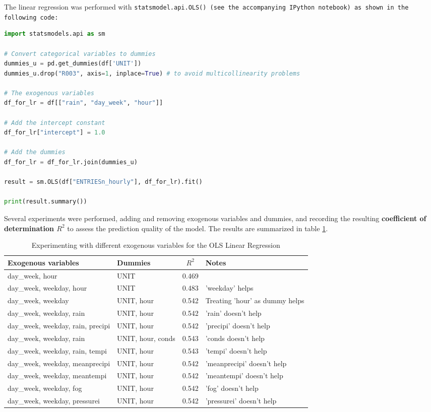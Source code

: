 \documentclass{article}
\begin{document}
The linear regression was performed with \tt statsmodel.api.OLS() \rm (see the accompanying IPython notebook) as shown in the following code:

\begin{lstlisting}[language=Python]
import statsmodels.api as sm

# Convert categorical variables to dummies
dummies_u = pd.get_dummies(df['UNIT'])
dummies_u.drop("R003", axis=1, inplace=True) # to avoid multicollinearity problems

# The exogenous variables
df_for_lr = df[["rain", "day_week", "hour"]]

# Add the intercept constant
df_for_lr["intercept"] = 1.0

# Add the dummies
df_for_lr = df_for_lr.join(dummies_u)

result = sm.OLS(df["ENTRIESn_hourly"], df_for_lr).fit()

print(result.summary())
\end{lstlisting}

Several experiments were performed, adding and removing exogenous variables and dummies, and recording the resulting \textbf{coefficient of determination $R^2$} to assess the prediction quality of the model. The results are summarized in table \ref{tab:lin_regr_exper}.


\begin{table}[ht]
\centering
\begin{tabular}{l|l|c|l}
\hline
Exogenous variables & Dummies & $R^2$ & Notes\\
\hline
day\_week, hour  & UNIT & 0.469 \\
day\_week, weekday, hour & UNIT & 0.483 & 'weekday' helps  \\
day\_week, weekday & UNIT, hour & 0.542 & Treating 'hour' as dummy helps \\
day\_week, weekday, rain & UNIT, hour & 0.542 & 'rain' doesn't help \\
day\_week, weekday, rain, precipi & UNIT, hour & 0.542 & 'precipi' doesn't help \\
day\_week, weekday, rain & UNIT, hour, conds & 0.543 & 'conds doesn't help \\
day\_week, weekday, rain, tempi & UNIT, hour & 0.543 & 'tempi' doesn't help \\
day\_week, weekday, meanprecipi & UNIT, hour & 0.542 & 'meanprecipi' doesn't help \\
day\_week, weekday, meantempi & UNIT, hour & 0.542 & 'meantempi' doesn't help \\
day\_week, weekday, fog & UNIT, hour & 0.542 & 'fog' doesn't help \\
day\_week, weekday, pressurei & UNIT, hour & 0.542 & 'pressurei' doesn't help \\
\hline
\end{tabular}
\caption{Experimenting with different exogenous variables for the OLS Linear Regression}
\label{tab:lin_regr_exper}
\end{table}
\end{document}
